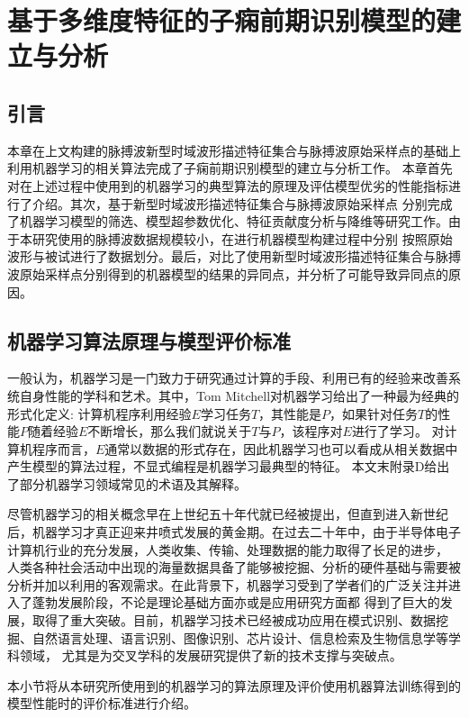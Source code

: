 \chapter{基于多维度特征的子痫前期识别模型的建立与分析}
\section{引言}
本章在上文构建的脉搏波新型时域波形描述特征集合与脉搏波原始采样点的基础上利用机器学习的相关算法完成了子痫前期识别模型的建立与分析工作。
本章首先对在上述过程中使用到的机器学习的典型算法的原理及评估模型优劣的性能指标进行了介绍。其次，基于新型时域波形描述特征集合与脉搏波原始采样点
分别完成了机器学习模型的筛选、模型超参数优化、特征贡献度分析与降维等研究工作。由于本研究使用的脉搏波数据规模较小，在进行机器模型构建过程中分别
按照原始波形与被试进行了数据划分。最后，对比了使用新型时域波形描述特征集合与脉搏波原始采样点分别得到的机器模型的结果的异同点，并分析了可能导致异同点的原因。

\section{机器学习算法原理与模型评价标准}
一般认为，机器学习是一门致力于研究通过计算的手段、利用已有的经验来改善系统自身性能的学科和艺术\cite{Zhou2016,Aurélien2018}。其中，Tom Mitchell对机器学习给出了一种最为经典的形式化定义:
计算机程序利用经验$E$学习任务$T$，其性能是$P$，如果针对任务$T$的性能$P$随着经验$E$不断增长，那么我们就说关于$T$与$P$，该程序对$E$进行了学习\cite{mitchell1997,Zhou2016}。
对计算机程序而言，$E$通常以数据的形式存在，因此机器学习也可以看成从相关数据中产生模型的算法过程，不显式编程是机器学习最典型的特征。
本文末附录D给出了部分机器学习领域常见的术语及其解释。

尽管机器学习的相关概念早在上世纪五十年代就已经被提出，但直到进入新世纪后，机器学习才真正迎来井喷式发展的黄金期。在过去二十年中，由于半导体电子计算机行业的充分发展，人类收集、传输、处理数据的能力取得了长足的进步，
人类各种社会活动中出现的海量数据具备了能够被挖掘、分析的硬件基础与需要被分析并加以利用的客观需求。在此背景下，机器学习受到了学者们的广泛关注并进入了蓬勃发展阶段，不论是理论基础方面亦或是应用研究方面都
得到了巨大的发展，取得了重大突破。目前，机器学习技术已经被成功应用在模式识别、数据挖掘、自然语言处理、语言识别、图像识别、芯片设计、信息检索及生物信息学等学科领域，
尤其是为交叉学科的发展研究提供了新的技术支撑与突破点\cite{Zhou2016,Aurélien2018,Li2017}。   

本小节将从本研究所使用到的机器学习的算法原理及评价使用机器算法训练得到的模型性能时的评价标准进行介绍。

